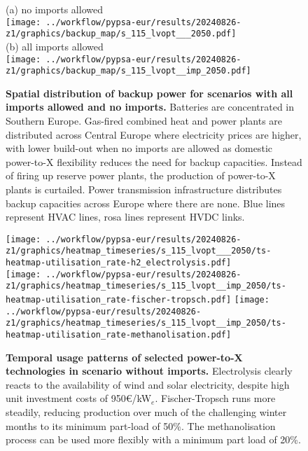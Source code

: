 \begin{figure*}
    \centering
    \footnotesize
    (a) no imports allowed  \\
    \texttt{[image: ../workflow/pypsa-eur/results/20240826-z1/graphics/backup\_map/s\_115\_lvopt\_\_\_2050.pdf]} \\
    (b) all imports allowed \\
    \texttt{[image: ../workflow/pypsa-eur/results/20240826-z1/graphics/backup\_map/s\_115\_lvopt\_\_imp\_2050.pdf]}
    \caption{\textbf{Spatial distribution of backup power for scenarios with all
    imports allowed and no imports.} Batteries are concentrated in Southern
    Europe. Gas-fired combined heat and power plants are distributed across
    Central Europe where electricity prices are higher, with lower build-out
    when no imports are allowed as domestic power-to-X flexibility reduces the
    need for backup capacities. Instead of firing up reserve power plants, the
    production of power-to-X plants is curtailed. Power transmission
    infrastructure distributes backup capacities across Europe where there are none.
    Blue lines represent HVAC lines, rosa lines represent HVDC links.}
    \label{fig:si:backup-power-map}
\end{figure*}


\begin{figure*}
    \centering
    \footnotesize
    \texttt{[image: ../workflow/pypsa-eur/results/20240826-z1/graphics/heatmap\_timeseries/s\_115\_lvopt\_\_\_2050/ts-heatmap-utilisation\_rate-h2\_electrolysis.pdf]} \\
    \texttt{[image: ../workflow/pypsa-eur/results/20240826-z1/graphics/heatmap\_timeseries/s\_115\_lvopt\_\_imp\_2050/ts-heatmap-utilisation\_rate-fischer-tropsch.pdf]}
    \texttt{[image: ../workflow/pypsa-eur/results/20240826-z1/graphics/heatmap\_timeseries/s\_115\_lvopt\_\_imp\_2050/ts-heatmap-utilisation\_rate-methanolisation.pdf]}
    \caption{\textbf{Temporal usage patterns of selected power-to-X technologies
    in scenario without imports.} Electrolysis clearly reacts to the
    availability of wind and solar electricity, despite high unit investment
    costs of 950\euro/kW$_e$. Fischer-Tropsch runs more steadily, reducing
    production over much of the challenging winter months to its minimum
    part-load of 50\%. The methanolisation process can be used more flexibly
    with a minimum part load of 20\%.}
    \label{fig:si:power-to-x}
\end{figure*}


